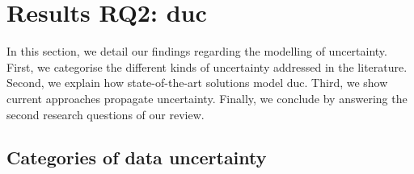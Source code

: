 \section[Results RQ2: data uncertainty]{Results RQ2: \gls{duc}}
\label{sec:sota:results:duc}

In this section, we detail our findings regarding the modelling of uncertainty.
First, we categorise the different kinds of uncertainty addressed in the literature.
Second, we explain how state-of-the-art solutions model \gls{duc}.
Third, we show current approaches propagate uncertainty.
Finally, we conclude by answering the second research questions of our review.

\subsection{Categories of data uncertainty}

